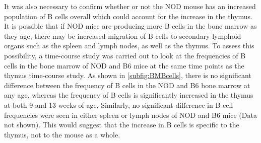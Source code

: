 It was also necessary to confirm whether or not the NOD mouse has an increased population of B cells overall which could account for the increase in the thymus.
It is possible that if NOD mice are producing more B cells in the bone marrow as they age, there may be increased migration of B cells to secondary lymphoid organs such as the spleen and lymph nodes, as well as the thymus.
To assess this possibility, a time-course study was carried out to look at the frequencies of B cells in the bone marrow of NOD and B6 mice at the same time points as the thymus time-course study.
As shown in \cref{subfig:BMBcells}, there is no significant difference between the frequency of B cells in the NOD and B6 bone marrow at any age, whereas the frequency of B cells is significantly increased in the thymus at both 9 and 13 weeks of age.
Similarly, no significant difference in B cell frequencies were seen in either spleen or lymph nodes of NOD and B6 mice (Data not shown).
This would suggest that the increase in B cells is specific to the thymus, not to the mouse as a whole.


